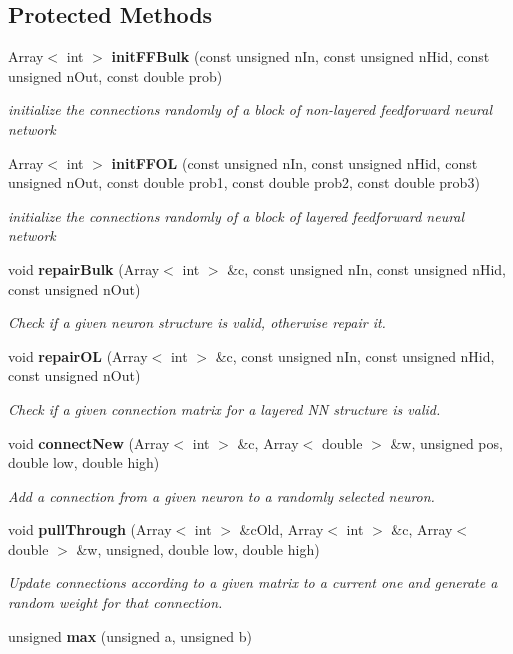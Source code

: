 \subsection*{Protected Methods}
\begin{CompactItemize}
\item 
Array$<$ int $>$ {\bf init\-FFBulk} (const unsigned n\-In, const unsigned n\-Hid, const unsigned n\-Out, const double prob)
\begin{CompactList}\small\item\em initialize the connections randomly of a block of non-layered feedforward neural network\item\end{CompactList}\item 
Array$<$ int $>$ {\bf init\-FFOL} (const unsigned n\-In, const unsigned n\-Hid, const unsigned n\-Out, const double prob1, const double prob2, const double prob3)
\begin{CompactList}\small\item\em initialize the connections randomly of a block of layered feedforward neural network\item\end{CompactList}\item 
void {\bf repair\-Bulk} (Array$<$ int $>$ \&c, const unsigned n\-In, const unsigned n\-Hid, const unsigned n\-Out)
\begin{CompactList}\small\item\em Check if a given neuron structure is valid, otherwise repair it.\item\end{CompactList}\item 
void {\bf repair\-OL} (Array$<$ int $>$ \&c, const unsigned n\-In, const unsigned n\-Hid, const unsigned n\-Out)
\begin{CompactList}\small\item\em Check if a given connection matrix for a layered NN structure is valid.\item\end{CompactList}\item 
void {\bf connect\-New} (Array$<$ int $>$ \&c, Array$<$ double $>$ \&w, unsigned pos, double low, double high)
\begin{CompactList}\small\item\em Add a connection from a given neuron to a randomly selected neuron.\item\end{CompactList}\item 
void {\bf pull\-Through} (Array$<$ int $>$ \&c\-Old, Array$<$ int $>$ \&c, Array$<$ double $>$ \&w, unsigned, double low, double high)
\begin{CompactList}\small\item\em Update connections according to a given matrix to a current one and generate a random weight for that connection.\item\end{CompactList}\item 
{}
unsigned {\bf max} (unsigned a, unsigned b)\label{classFFManip_b6}


\end{CompactItemize}
